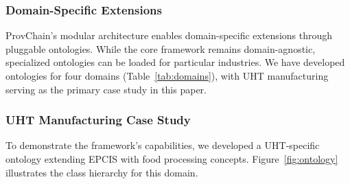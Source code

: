 \documentclass[preprint,review,12pt,authoryear]{elsarticle}
\begin{document}
\subsubsection{Domain-Specific Extensions}

ProvChain's modular architecture enables domain-specific extensions through pluggable ontologies. While the core framework remains domain-agnostic, specialized ontologies can be loaded for particular industries. We have developed ontologies for four domains (Table~\ref{tab:domains}), with UHT manufacturing serving as the primary case study in this paper.

\begin{table}[htbp]
\centering
\caption{Domain-Specific Ontologies in ProvChain}
\label{tab:domains}
\end{table}

\subsubsection{UHT Manufacturing Case Study}

To demonstrate the framework's capabilities, we developed a UHT-specific ontology extending EPCIS with food processing concepts. Figure~\ref{fig:ontology} illustrates the class hierarchy for this domain.
\end{document}
